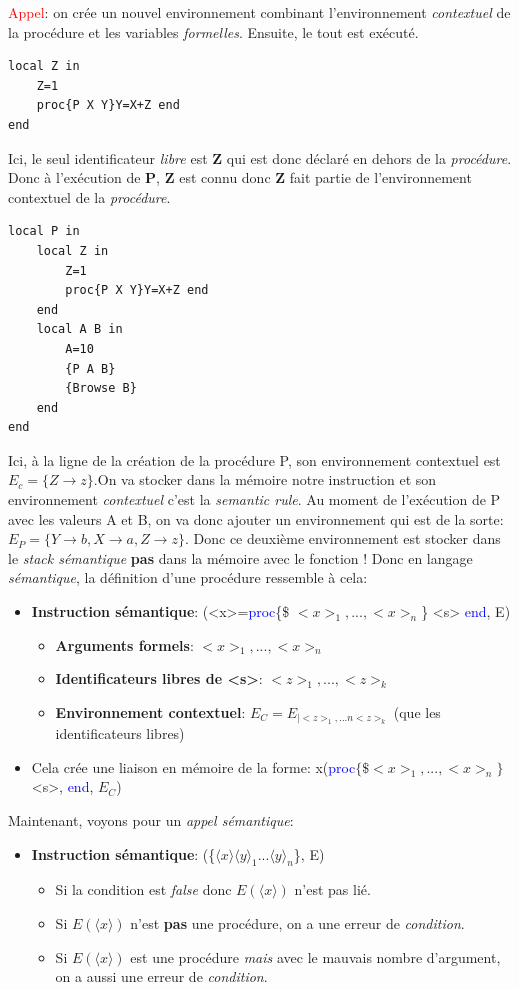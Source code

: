 \documentclass{report}
\begin{document}
\textcolor{red}{Appel}: on crée un nouvel environnement combinant l'environnement \textit{contextuel} de la procédure et les variables \textit{formelles}. Ensuite, le tout est exécuté.
\begin{lstlisting}
local Z in 
	Z=1
	proc{P X Y}Y=X+Z end
end
\end{lstlisting}
Ici, le seul identificateur \textit{libre} est \textbf{Z} qui est donc déclaré en dehors de la \textit{procédure}. Donc à l'exécution de \textbf{P}, \textbf{Z} est connu donc \textbf{Z} fait partie de l'environnement contextuel de la \textit{procédure}.
\begin{lstlisting}
local P in
	local Z in 
		Z=1
		proc{P X Y}Y=X+Z end
	end
	local A B in
		A=10
		{P A B}
		{Browse B}
	end
end 
\end{lstlisting}
Ici, à la ligne de la création de la procédure P, son environnement contextuel est $E_c = \{Z \rightarrow z\}$.On va stocker dans la mémoire notre instruction et son environnement \textit{contextuel} c'est la \textit{semantic rule}. Au moment de l'exécution de P avec les valeurs A et B, on va donc ajouter un environnement qui est de la sorte: $E_P = \{Y \rightarrow b, X \rightarrow a, Z \rightarrow z\}$. Donc ce deuxième environnement est stocker dans le \textit{stack sémantique} \textbf{pas} dans la mémoire avec le fonction !
Donc en langage \textit{sémantique}, la définition d'une procédure ressemble à cela:
\begin{itemize}
\item \textbf{Instruction sémantique}: (<x>=\textcolor{blue}{proc}\{\$ $<x>_1, ..., <x>_n$\} <s> \textcolor{blue}{end}, E)
\begin{itemize}
\item \textbf{Arguments formels}: $<x>_1, ..., <x>_n$
\item \textbf{Identificateurs libres de <s>}: $<z>_1, ..., <z>_k$
\item \textbf{Environnement contextuel}: $E_C = E_{|<z>_1, ...n <z>_k}$ (que les identificateurs libres)
\end{itemize}
\item Cela crée une liaison en mémoire de la forme: x(\textcolor{blue}{proc}$\{\$<x>_1, ..., <x>_n\}$<s>, \textcolor{blue}{end}, $E_C$)
\end{itemize}
Maintenant, voyons pour un \textit{appel sémantique}:
\begin{itemize}
\item \textbf{Instruction sémantique}: (\{$\langle x \rangle \langle y \rangle_1 ... \langle y \rangle_n$\}, E)
\begin{itemize}
\item Si la condition est \textit{false} donc $E(\langle x \rangle)$ n'est pas lié.
\item Si $E(\langle x \rangle)$ n'est \textbf{pas} une procédure, on a une erreur de \textit{condition}.
\item Si $E(\langle x \rangle)$ est une procédure \textit{mais} avec le mauvais nombre d'argument, on a aussi une erreur de \textit{condition}.
\end{itemize}
\end{itemize}
\end{document}
